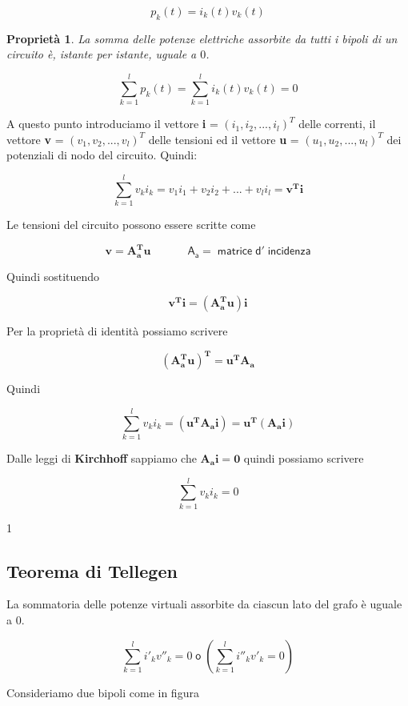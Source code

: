 \documentclass[a4paper]{report}
\begin{document}
\[
p_k(t)=i_k(t)v_k(t)
\]

\newtheorem{mydef}{Propriet\`a}
\begin{mydef}
  La somma delle potenze elettriche assorbite da tutti i bipoli di
  un circuito \`e, istante per istante, uguale a $0$.
\end{mydef}

\[
\sum_{k=1}^{l} p_k(t) = \sum_{k=1}^{l} i_k(t)v_k(t)=0
\]

A questo punto introduciamo il vettore {\bf i} = $(i_1, i_2,..., i_l)^T$
delle correnti, il vettore {\bf v} = $(v_1, v_2,..., v_l)^T$ delle
tensioni ed il vettore {\bf u} = $(u_1, u_2,..., u_l)^T$ dei
potenziali di nodo del circuito. Quindi:

\[
\sum_{k=1}^l v_ki_k=v_1i_1+v_2i_2+...+v_li_l = \mathbf{v^Ti}
\]

Le tensioni del circuito possono essere scritte come

\[
\mathbf{v= A_a^Tu} \quad \quad \quad \mathsf{\;A_a= \; matrice\; d'\; incidenza}
\]

Quindi sostituendo

\[
\mathbf{v^Ti=(A_a^Tu)i}
\]

Per la propriet\`a di identit\`a possiamo scrivere

\[
\mathbf{(A_a^Tu)^T=u^TA_a}
\]

Quindi

\[
\sum_{k=1}^l v_ki_k=\mathbf{(u^TA_ai) = u^T(A_ai)}
\]

Dalle leggi di {\bf Kirchhoff} sappiamo che $\mathbf{A_ai=0}$ quindi
possiamo scrivere

\[
\sum_{k=1}^{l}v_ki_k=0
\]

1
\subsection{Teorema di Tellegen}

La sommatoria delle potenze virtuali assorbite da ciascun lato del
grafo \`e uguale a $0$.

\[
\sum_{k=1}^li'_k v''_k = 0\; \mathsf {o}\; \left(\sum_{k=1}^li''_k v'_k=0\right)
\]

Consideriamo due bipoli come in figura

\vspace{1.5cm}
\end{document}
